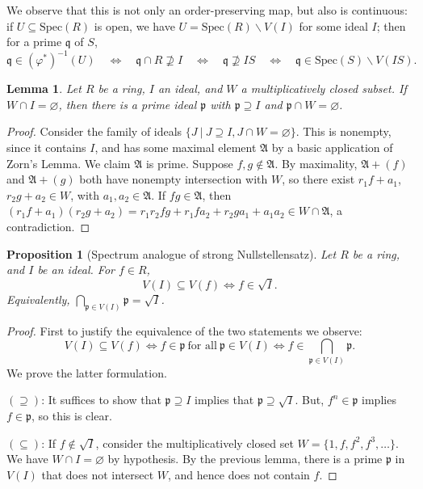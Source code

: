 \documentclass{amsart}[12pt]
\def\fA{\mathfrak A}
\newcommand{\p}{{\mathfrak p}}
\newcommand{\q}{{\mathfrak q}}
\numberwithin{equation}{section}
\theoremstyle{plain} %
\newtheorem{lemma}[equation]{Lemma}
\newtheorem{proposition}[equation]{Proposition}
\theoremstyle{definition}
\theoremstyle{remark}
\newcommand{\Spec}{\mathrm{Spec}}
\begin{document}
We observe that this is not only an order-preserving map, but also is continuous: if $U\subseteq \Spec(R)$ is open, we have $U=\Spec(R) \smallsetminus V(I)$ for some ideal $I$; then for a prime $\q$ of $S$,
\[\q\in (\varphi^*)^{-1}(U) \quad \Leftrightarrow \quad \q \cap R \not\supseteq I  \quad \Leftrightarrow \quad \q \not\supseteq IS  \quad \Leftrightarrow \quad \q \in \Spec(S) \smallsetminus V(IS).\]

\begin{lemma} Let $R$ be a ring, $I$ an ideal, and $W$ a multiplicatively closed subset. If $W\cap I=\varnothing$, then there is a prime ideal $\p$ with $\p \supseteq I$ and $\p \cap W=\varnothing$.
\end{lemma}
\begin{proof}
	Consider the family of ideals $\{ J \ | \ J \supseteq I, J \cap W=\varnothing\}$. This is nonempty, since it contains $I$, and has some maximal element $\fA$ by a basic application of Zorn's Lemma. We claim $\fA$ is prime. Suppose $f,g\notin \fA$. By maximality, $\fA+(f)$ and $\fA+(g)$ both have nonempty intersection with $W$, so there exist $r_1f+a_1$, $r_2 g+a_2 \in W$, with $a_1,a_2\in \fA$. If $fg\in \fA$, then $(r_1f+a_1)(r_2g+a_2)=r_1 r_2 fg + r_1 f a_2 + r_2 g a_1 + a_1 a_2 \in W \cap \fA$, a contradiction.
\end{proof}


\begin{proposition}[Spectrum analogue of strong Nullstellensatz]
	Let $R$ be a ring, and $I$ be an ideal. For $f\in R$,
	\[  V(I) \subseteq V(f) \Longleftrightarrow f\in \sqrt{I}.\] 
	Equivalently, $\bigcap_{\p \in V(I)} \p = \sqrt{I}$.
\end{proposition}
\begin{proof}
First to justify the equivalence of the two statements we observe: 
\[V(I) \subseteq V(f) \Leftrightarrow f\in \p \ \text{for all} \ \p\in V(I)  \Leftrightarrow f \in \bigcap_{\p \in V(I)} \p.\]
We prove the latter formulation.

$(\supseteq)$: It suffices to show that $\p \supseteq I$ implies that $\p \supseteq \sqrt{I}$. But, $f^n\in \p$ implies $f\in \p$, so this is clear.

$(\subseteq)$: If $f\notin \sqrt{I}$, consider the multiplicatively closed set $W=\{1,f,f^2,f^3,\dots\}$. We have $W\cap I=\varnothing$ by hypothesis. By the previous lemma, there is a prime $\p$ in $V(I)$ that does not intersect $W$, and hence does not contain $f$.
\end{proof}
\end{document}

